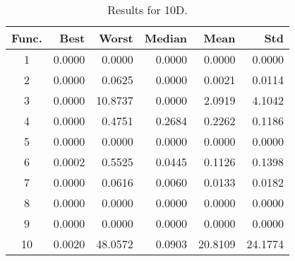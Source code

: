 \begin{table}[ht]
\centering
\caption{ Results for 10D. }
\label{tab:10D}
\begin{tabular}{crrrrr}
\hline
{Func.} & Best & Worst & Median & Mean & Std \\
\hline
1 & 0.0000 & 0.0000 & 0.0000 & 0.0000 & 0.0000 \\
2 & 0.0000 & 0.0625 & 0.0000 & 0.0021 & 0.0114 \\
3 & 0.0000 & 10.8737 & 0.0000 & 2.0919 & 4.1042 \\
4 & 0.0000 & 0.4751 & 0.2684 & 0.2262 & 0.1186 \\
5 & 0.0000 & 0.0000 & 0.0000 & 0.0000 & 0.0000 \\
6 & 0.0002 & 0.5525 & 0.0445 & 0.1126 & 0.1398 \\
7 & 0.0000 & 0.0616 & 0.0060 & 0.0133 & 0.0182 \\
8 & 0.0000 & 0.0000 & 0.0000 & 0.0000 & 0.0000 \\
9 & 0.0000 & 0.0000 & 0.0000 & 0.0000 & 0.0000 \\
10 & 0.0020 & 48.0572 & 0.0903 & 20.8109 & 24.1774 \\
\hline
\end{tabular}
\end{table}
